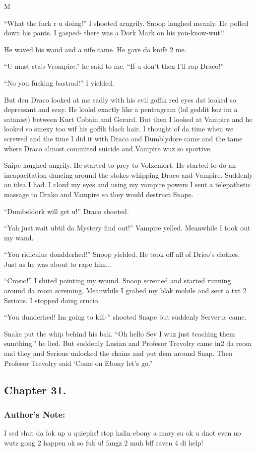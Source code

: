 M\documentclass{article}
\begin{document}
“What the fuck r u doing!” I shooted arngrily. Snoop laughed meanly. He polled down his pants. I gasped- there was a Dork Mark on his you-know-wut!!

He waved his wand and a nife came. He gave da knife 2 me.

“U must stab Vrompire.” he said to me. “If u don’t then I’ll rap Draco!”

“No you fucking bastrad!” I yielded.

But den Draco looked at me sadly with his evil goffik red eyes dat looked so depressant and sexy. He lookd exactly like a pentragram (lol geddit koz im a satanist) between Kurt Cobain and Gerard. But then I looked at Vampire and he looked so smexy too wif his goffik black hair. I thought of da time when we screwed and the time I did it with Draco and Dumblydore came and the tame where Draco almost commited suicide and Vampire wuz so sportive.

Snipe laughed angrily. He started to prey to Volxemort. He started to do an incapacitation dancing around the stokes whipping Draco and Vampire. Suddenly an idea I had. I clozd my eyes and using my vampire powers I sent a telepathetic massage to Drako and Vampire so they would destruct Snape.

“Dumbeldork will get u!” Draco shooted.

“Yah just wait ubtil da Mystery find out!” Vampire yelled. Meanwhile I took out my wand.

“You ridiculus dondderhed!” Snoop yielded. He took off all of Drico’s clothes. Just as he was about to rape him...

“Crosio!” I shited pointing my wound. Snoop scremed and started running around da room screming. Meanwhile I grabed my blak mobile and sent a txt 2 Serious. I stopped doing crucio.

“You dunderhed! Im going to kill-” shooted Snape but suddenly Serverus came.

Snake put the whip behind his bak. “Oh hello Sev I wuz just teaching them sumthing.” he lied. But suddenly Lusian and Profesor Trevolry came in2 da room and they and Serious unlocked the chains and put dem around Snap. Then Profesor Trevolry said ‘Come on Ebony let’s go.”

\clearpage\nolinenumbers
\subsection*{Chapter 31.}

\subsubsection*{Author's Note: }I sed shut da fok up u quiephs! stop kalin ebony a mary su ok u dnot even no wutz gong 2 happen ok so fuk u! fangz 2 muh bff raven 4 di help!
\end{document}
